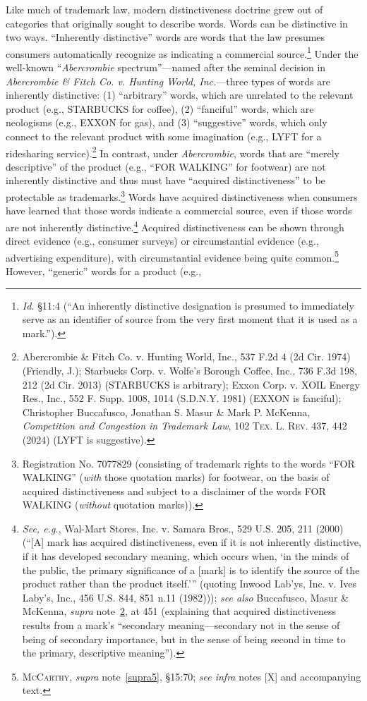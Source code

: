 \documentclass[letterpaper, 11pt, oneside]{article}
\begin{document}
Like much of trademark law, modern distinctiveness doctrine grew out of categories that originally sought to describe words. Words can be distinctive in two ways. ``Inherently distinctive'' words are words that the law presumes consumers automatically recognize as indicating a commercial source.\footnote{\textit{Id.} \S 11:4 (``An inherently distinctive designation is presumed to immediately serve as an identifier of source from the very first moment that it is used as a mark.'').} Under the well-known ``\textit{Abercrombie} spectrum''—named after the seminal decision in \textit{Abercrombie \& Fitch Co. v. Hunting World, Inc.}—three types of words are inherently distinctive: (1) ``arbitrary'' words, which are unrelated to the relevant product (e.g., STARBUCKS for coffee), (2) “fanciful” words, which are neologisms (e.g., EXXON for gas), and (3) ``suggestive'' words, which only connect to the relevant product with some imagination (e.g., LYFT for a ridesharing service).\footnote{\label{supra11} Abercrombie \& Fitch Co. v. Hunting World, Inc., 537 F.2d 4 (2d Cir. 1974) (Friendly, J.); Starbucks Corp. v. Wolfe's Borough Coffee, Inc., 736 F.3d 198, 212 (2d Cir. 2013) (STARBUCKS is arbitrary); Exxon Corp. v. XOIL Energy Res., Inc., 552 F. Supp. 1008, 1014 (S.D.N.Y. 1981) (EXXON is fanciful); Christopher Buccafusco, Jonathan S. Masur \& Mark P. McKenna, \textit{Competition and Congestion in Trademark Law}, 102 \textsc{Tex. L. Rev.} 437, 442 (2024) (LYFT is suggestive).} In contrast, under \textit{Abercrombie}, words that are ``merely descriptive'' of the product (e.g., ``FOR WALKING'' for footwear) are not inherently distinctive and thus must have ``acquired distinctiveness'' to be protectable as trademarks.\footnote{Registration No. 7077829 (consisting of trademark rights to the words ``FOR WALKING'' (\textit{with} those quotation marks) for footwear, on the basis of acquired distinctiveness and subject to a disclaimer of the words FOR WALKING (\textit{without} quotation marks)).} Words have acquired distinctiveness when consumers have learned that those words indicate a commercial source, even if those words are not inherently distinctive.\footnote{\textit{See, e.g.}, Wal-Mart Stores, Inc. v. Samara Bros., 529 U.S. 205, 211 (2000) (``[A] mark has acquired distinctiveness, even if it is not inherently distinctive, if it has developed secondary meaning, which occurs when, `in the minds of the public, the primary significance of a [mark] is to identify the source of the product rather than the product itself.'\thinspace'' (quoting Inwood Lab'ys, Inc. v. Ives Laby's, Inc., 456 U.S. 844, 851 n.11 (1982))); \textit{see also} Buccafusco, Masur \& McKenna, \textit{supra} note~\ref{supra11}, at 451 (explaining that acquired distinctiveness results from a mark's ``secondary meaning—secondary not in the sense of being of secondary importance, but in the sense of being second in time to the primary, descriptive meaning'').} Acquired distinctiveness can be shown through direct evidence (e.g., consumer surveys) or circumstantial evidence (e.g., advertising expenditure), with circumstantial evidence being quite common.\footnote{\textsc{McCarthy}, \textit{supra} note~\ref{supra5}, \S 15:70; \textit{see infra} notes [X] and accompanying text.} However, ``generic'' words for a product (e.g., 
\end{document}
